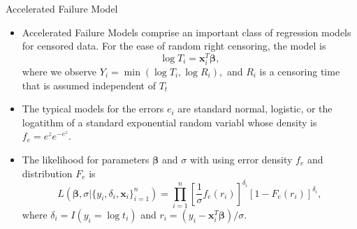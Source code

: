 \documentclass{beamer}
\begin{document}
       \begin{frame}{Accelerated Failure Model}
        \begin{itemize}
            \item Accelerated Failure Models comprise an important class of regression models for censored data. For the ease of random right censoring, the model is 
            $$\log T_{i} = \mathbf{x}^{T}_{i}\boldsymbol{\beta}, $$
            where we observe $Y_{i} = \min\left(\log T_{i}, \log R_{i}\right),$ and $R_{i}$ is a censoring time that is assumed independent of $T_{t}$
            \item The typical models for the errors $e_{i}$ are standard normal, logistic, or the logatithm of a standard exponential random variabl whose density is $f_{e} = e^{z}e^{-e^{z}}$.
            \item The likelihood for parameters $\boldsymbol{\beta}$ and $\sigma$ with using error density $f_{e}$ and distribution $F_{e}$ is 
            $$L(\boldsymbol{\beta}, \sigma|\{y_{i}, \delta_{i}, \mathbf{x}_{i}\}^{n}_{i=1}) = \prod^{n}_{i=1}\left[\frac{1}{\sigma}f_{e}(r_{i})\right]^{\delta_{i}}\left[1 - F_{e}(r_{i})\right]^{\delta_{i}},$$
            where $\delta_{i} = I(y_{i} = \log t_{i})$ and $r_{i} = (y_{i} - \mathbf{x}^{T}_{i}\boldsymbol{\beta})/\sigma.$ 
           
        \end{itemize}
    \end{frame}
    
\end{document}
